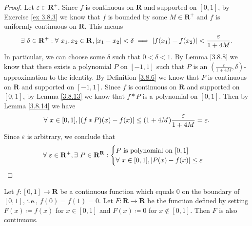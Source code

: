 \begin{proof}
    Let \(\varepsilon \in \mathbf{R}^+\).
    Since \(f\) is continuous on \(\mathbf{R}\) and supported on \([0, 1]\), by Exercise \ref{ex 3.8.3} we know that \(f\) is bounded by some \(M \in \mathbf{R}^+\) and \(f\) is uniformly continuous on \(\mathbf{R}\).
    This means
    \[
        \exists\ \delta \in \mathbf{R}^+ : \forall\ x_1, x_2 \in \mathbf{R}, \abs*{x_1 - x_2} < \delta \implies \abs*{f(x_1) - f(x_2)} < \frac{\varepsilon}{1 + 4M}.
    \]
    In particular, we can choose some \(\delta\) such that \(0 < \delta < 1\).
    By Lemma \ref{3.8.8} we know that there exists a polynomial \(P\) on \([-1, 1]\) such that \(P\) is an \((\frac{\varepsilon}{1 + 4M}, \delta)\)-approximation to the identity.
    By Definition \ref{3.8.6} we know that \(P\) is continuous on \(\mathbf{R}\) and supported on \([-1, 1]\).
    Since \(f\) is continuous on \(\mathbf{R}\) and supported on \([0, 1]\), by Lemma \ref{3.8.13} we know that \(f * P\) is a polynomial on \([0, 1]\).
    Then by Lemma \ref{3.8.14} we have
    \[
        \forall\ x \in [0, 1], \abs*{(f * P)(x) - f(x)} \leq (1 + 4M) \frac{\varepsilon}{1 + 4M} = \varepsilon.
    \]
    Since \(\varepsilon\) is arbitrary, we conclude that
    \[
        \forall\ \varepsilon \in \mathbf{R}^+, \exists\ P \in \mathbf{R}^{\mathbf{R}} : \begin{cases}
            P \text{ is polynomial on } [0, 1] \\
            \forall\ x \in [0, 1], \abs*{P(x) - f(x)} \leq \varepsilon
        \end{cases}
    \]
\end{proof}

\begin{lemma}\label{3.8.16}
    Let \(f : [0, 1] \to \mathbf{R}\) be a continuous function which equals \(0\) on the boundary of \([0, 1]\), i.e., \(f(0) = f(1) = 0\).
    Let \(F : \mathbf{R} \to \mathbf{R}\) be the function defined by setting \(F(x) \coloneqq f(x)\) for \(x \in [0, 1]\) and \(F(x) \coloneqq 0\) for \(x \notin [0, 1]\).
    Then \(F\) is also continuous.
\end{lemma}

